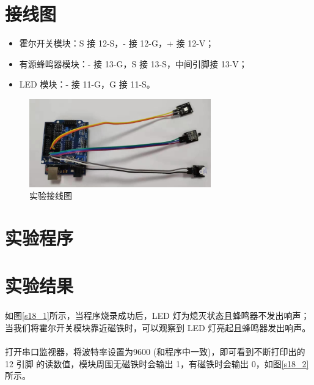 \documentclass[UTF8, oneside]{ctexbook}
\begin{document}
\section{接线图}
\begin{itemize}
    \item 霍尔开关模块：S 接 12-S，- 接 12-G，+ 接 12-V；
    \item 有源蜂鸣器模块：- 接 13-G，S 接 13-S，中间引脚接 13-V；
    \item LED 模块：- 接 11-G，G 接 11-S。
\end{itemize}
\begin{figure}[h]
    \centering
    \includegraphics[width=0.7\textwidth]{./result/sensor/18/lines2.png}
    \caption{实验接线图}
    \label{s18_line}
\end{figure}

\section{实验程序}


\section{实验结果}
\paragraph{}
如图\ref{s18_1}所示，当程序烧录成功后，LED 灯为熄灭状态且蜂鸣器不发出响声；
当我们将霍尔开关模块靠近磁铁时，可以观察到 LED 灯亮起且蜂鸣器发出响声。

\paragraph{}
打开串口监视器，将波特率设置为9600 (和程序中一致)，即可看到不断打印出的 12 引脚
的读数值，模块周围无磁铁时会输出 1，有磁铁时会输出 0，如图\ref{s18_2}所示。
\end{document}
